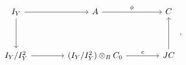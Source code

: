 \[
\begin{tikzcd}[column sep=4.0em, row sep=3.6em]
 I_Y \arrow[r] \arrow[d]
 &
 A \arrow[r,"\phi"]
 &
 C
 \\
 I_Y/I_Y^2 \arrow[r]
 &
 (I_Y/I_Y^2)\otimes_B C_0 \arrow[r,"c"]
 &
 JC \arrow[u]
\end{tikzcd}
\, ,
\]
